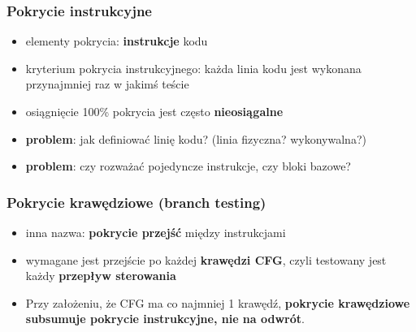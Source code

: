 \documentclass[../main.tex]{subfiles}
\begin{document}
    \subsubsection{Pokrycie instrukcyjne}
    \begin{itemize}
        \item elementy pokrycia: \textbf{instrukcje} kodu
        \item kryterium pokrycia instrukcyjnego: każda linia kodu jest wykonana
        przynajmniej raz w jakimś teście
        \item osiągnięcie 100\% pokrycia jest często \textbf{nieosiągalne}
        \item \textbf{problem}: jak definiować linię kodu? (linia fizyczna? wykonywalna?)
        \item \textbf{problem}: czy rozważać pojedyncze instrukcje, czy bloki bazowe?
    \end{itemize}


    \subsubsection{Pokrycie krawędziowe (branch testing)}
    \begin{itemize}
        \item inna nazwa: \textbf{pokrycie przejść} między instrukcjami
        \item wymagane jest przejście po każdej
        \textbf{krawędzi CFG}, czyli testowany jest każdy \textbf{przepływ sterowania}
        \item Przy założeniu, że CFG ma co najmniej 1 krawędź, \textbf{pokrycie
        krawędziowe subsumuje pokrycie instrukcyjne, nie na odwrót}.
    \end{itemize}
\end{document}
